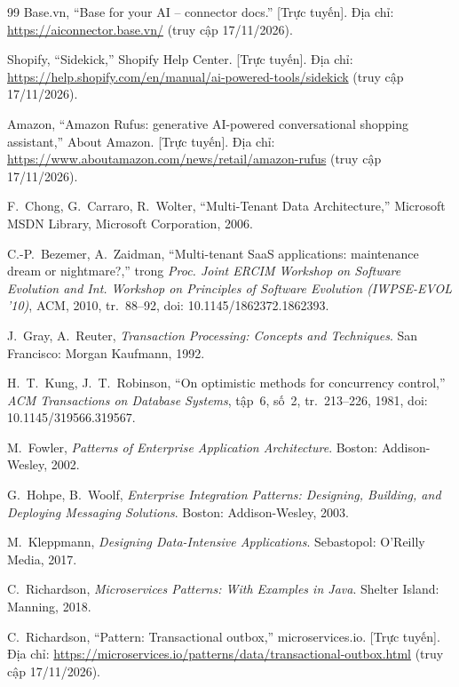 \begin{thebibliography}{99}
Base.vn, ``Base for your AI -- connector docs.'' [Trực tuyến]. Địa chỉ: \url{https://aiconnector.base.vn/} (truy cập 17/11/2026).

Shopify, ``Sidekick,'' Shopify Help Center. [Trực tuyến]. Địa chỉ: \url{https://help.shopify.com/en/manual/ai-powered-tools/sidekick} (truy cập 17/11/2026).

Amazon, ``Amazon Rufus: generative AI-powered conversational shopping assistant,'' About Amazon. [Trực tuyến]. Địa chỉ: \url{https://www.aboutamazon.com/news/retail/amazon-rufus} (truy cập 17/11/2026).

F.~Chong, G.~Carraro, R.~Wolter, ``Multi-Tenant Data Architecture,'' Microsoft MSDN Library, Microsoft Corporation, 2006.

C.-P.~Bezemer, A.~Zaidman, ``Multi-tenant SaaS applications: maintenance dream or nightmare?,'' trong \emph{Proc. Joint ERCIM Workshop on Software Evolution and Int. Workshop on Principles of Software Evolution (IWPSE-EVOL '10)}, ACM, 2010, tr.~88--92, doi: 10.1145/1862372.1862393.

J.~Gray, A.~Reuter, \emph{Transaction Processing: Concepts and Techniques}. San Francisco: Morgan Kaufmann, 1992.

H.~T.~Kung, J.~T.~Robinson, ``On optimistic methods for concurrency control,'' \emph{ACM Transactions on Database Systems}, tập~6, số~2, tr.~213--226, 1981, doi: 10.1145/319566.319567.

M.~Fowler, \emph{Patterns of Enterprise Application Architecture}. Boston: Addison-Wesley, 2002.

G.~Hohpe, B.~Woolf, \emph{Enterprise Integration Patterns: Designing, Building, and Deploying Messaging Solutions}. Boston: Addison-Wesley, 2003.

M.~Kleppmann, \emph{Designing Data-Intensive Applications}. Sebastopol: O'Reilly Media, 2017.

C.~Richardson, \emph{Microservices Patterns: With Examples in Java}. Shelter Island: Manning, 2018.

C.~Richardson, ``Pattern: Transactional outbox,'' microservices.io. [Trực tuyến]. Địa chỉ: \url{https://microservices.io/patterns/data/transactional-outbox.html} (truy cập 17/11/2026).


\end{thebibliography}

